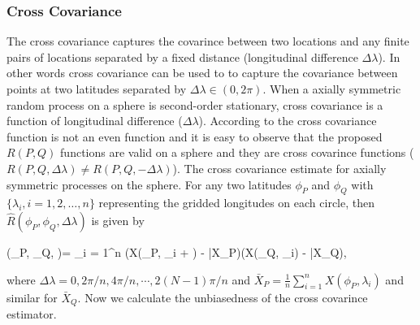 			\subsubsection{Cross Covariance}
					
			The cross covariance captures the covarince between two locations and any finite pairs of locations separated by a fixed distance (longitudinal difference $\Delta\lambda$). In other words cross covariance can be used to to capture the covariance between points at two latitudes separated by $\Delta \lambda \in (0,2\pi)$. When a axially symmetric random process on a sphere is second-order stationary, cross covariance is a function of longitudinal difference ($\Delta\lambda$). According to \cite{Wackernagel2013} the cross covariance function is not an even function and it is easy to observe that the proposed $R(P,Q)$ functions are valid on a sphere and they are cross covarince functions ($R(P,Q, \Delta\lambda) \ne R(P,Q,-\Delta\lambda)$). 
			The cross covariance estimate for axially symmetric processes on the sphere. For any two latitudes $\phi_P$ and $\phi_Q$ with $\{\lambda_i, i = 1, 2, \ldots, n\}$ representing the gridded longitudes on each circle, then $\hat{R}(\phi_P, \phi_Q, \Delta \lambda)$ is given by
					
				
					
			\beq
			(\phi_P, \phi_Q, \Delta \lambda)= \sum_{i = 1}^n (X(\phi_P, \lambda_i + \Delta \lambda) - \bar{X}_P)(X(\phi_Q, \lambda_i) - \bar{X}_Q), 
			\eeq
				
			where $\Delta \lambda = 0, 2\pi/n, 4\pi/n, \cdots, 2(N-1)\pi/n$ and $\bar{X}_P = \frac{1}{n}\sum_{i=1}^n X(\phi_P, \lambda_i)$ and similar for $\bar{X}_Q$. Now we calculate the unbiasedness of the cross covarince estimator. 
				
